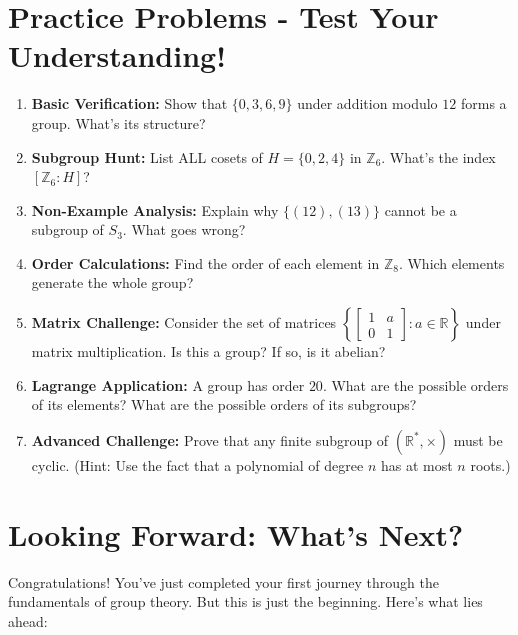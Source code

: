 \documentclass[12pt]{article}
\begin{document}
\section{\textcolor{SectionColor}{Practice Problems - Test Your Understanding!}}

\begin{enumerate}
\item \textbf{Basic Verification:} Show that $\{0, 3, 6, 9\}$ under addition modulo $12$ forms a group. What's its structure?

\item \textbf{Subgroup Hunt:} List ALL cosets of $H = \{0, 2, 4\}$ in $\mathbb{Z}_6$. What's the index $[\mathbb{Z}_6 : H]$?

\item \textbf{Non-Example Analysis:} Explain why $\{(12), (13)\}$ cannot be a subgroup of $S_3$. What goes wrong?

\item \textbf{Order Calculations:} Find the order of each element in $\mathbb{Z}_8$. Which elements generate the whole group?

\item \textbf{Matrix Challenge:} Consider the set of matrices $\left\{\begin{bmatrix} 1 & a \\ 0 & 1 \end{bmatrix} : a \in \mathbb{R}\right\}$ under matrix multiplication. Is this a group? If so, is it abelian?

\item \textbf{Lagrange Application:} A group has order $20$. What are the possible orders of its elements? What are the possible orders of its subgroups?

\item \textbf{Advanced Challenge:} Prove that any finite subgroup of $(\mathbb{R}^*, \times)$ must be cyclic. (Hint: Use the fact that a polynomial of degree $n$ has at most $n$ roots.)
\end{enumerate}

\section{\textcolor{SectionColor}{Looking Forward: What's Next?}}

Congratulations! You've just completed your first journey through the fundamentals of group theory. But this is just the beginning. Here's what lies ahead:
\end{document}
